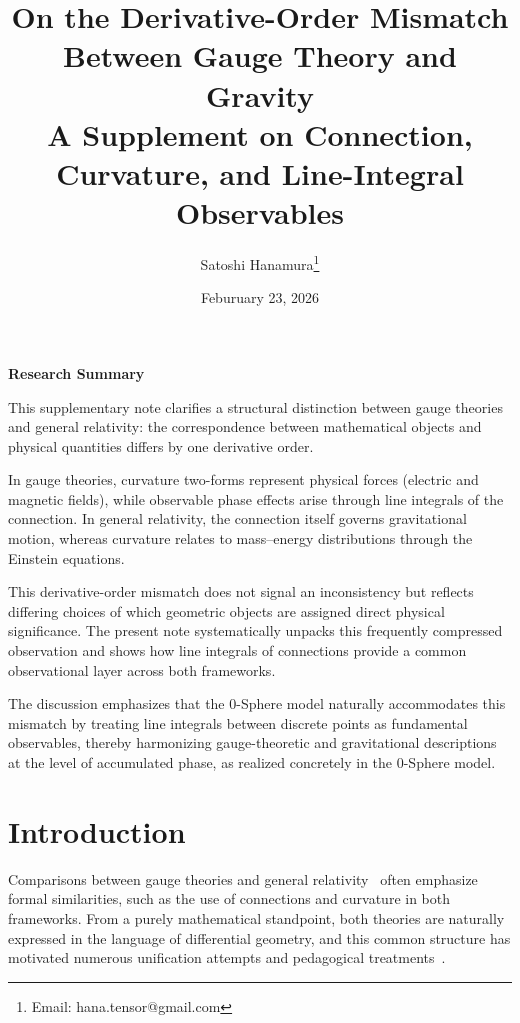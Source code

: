 \documentclass[12pt,letterpaper]{article} %
\begin{document}
\title{On the Derivative-Order Mismatch\\ Between Gauge Theory and Gravity\\
\normalsize A Supplement on Connection, Curvature, and Line-Integral Observables}


\author{Satoshi Hanamura\thanks{Email: hana.tensor@gmail.com}}
\date{Feburuary 23, 2026}

\maketitle

\tableofcontents

\clearpage

\begin{center}
\textbf{Research Summary}
\end{center}

\justifying
This supplementary note clarifies a structural distinction between gauge theories and general relativity: the correspondence between mathematical objects and physical quantities differs by one derivative order.

In gauge theories, curvature two-forms represent physical forces (electric and magnetic fields), while observable phase effects arise through line integrals of the connection. In general relativity, the connection itself governs gravitational motion, whereas curvature relates to mass--energy distributions through the Einstein equations.

This derivative-order mismatch does not signal an inconsistency but reflects differing choices of which geometric objects are assigned direct physical significance. The present note systematically unpacks this frequently compressed observation and shows how line integrals of connections provide a common observational layer across both frameworks.

The discussion emphasizes that the 0-Sphere model naturally accommodates this mismatch by treating line integrals between discrete points as fundamental observables, thereby harmonizing gauge-theoretic and gravitational descriptions at the level of accumulated phase, as realized concretely in the 0-Sphere model.

\clearpage

\section{Introduction}

\justifying
Comparisons between gauge theories and general relativity~\cite{EinsteinGR} often emphasize formal similarities, such as the use of connections and curvature in both frameworks. From a purely mathematical standpoint, both theories are naturally expressed in the language of differential geometry, and this common structure has motivated numerous unification attempts and pedagogical treatments~\cite{YangMills,Frankel,Nakahara}.
\end{document}
